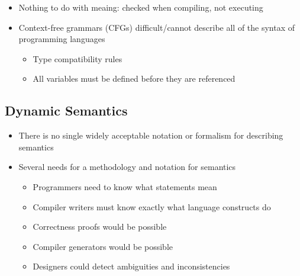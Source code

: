 \documentclass[12pt]{article}
\begin{document}
\begin{itemize}
  \item Nothing to do with meaing: checked when compiling, not executing
  \item Context-free grammars (CFGs) difficult/cannot describe all of the syntax of programming languages
  \begin{itemize}
    \item Type compatibility rules
    \item All variables must be defined before they are referenced
  \end{itemize}
\end{itemize}

\subsection{Dynamic Semantics}

\begin{itemize}
  \item There is no single widely acceptable notation or formalism for describing semantics
  \item Several needs for a methodology and notation for semantics
  \begin{itemize}
    \item Programmers need to know what statements mean
    \item Compiler writers must know exactly what language constructs do
    \item Correctness proofs would be possible
    \item Compiler generators would be possible
    \item Designers could detect ambiguities and inconsistencies
  \end{itemize}
\end{itemize}
\end{document}
